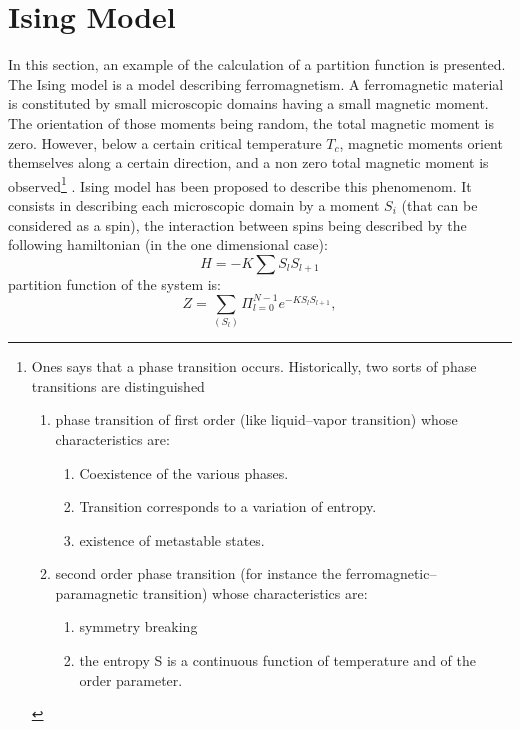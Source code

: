 \documentclass[12pt]{book}
\begin{document}
\section{Ising Model}\label{secmodising}
In this section, an example of the calculation of a partition function is
presented. The Ising model
\cite{ma:equad:Schuster88,ph:physt:Diu89}
 is a model describing ferromagnetism. 
A ferromagnetic  material is constituted by small microscopic domains having a
small magnetic moment. The orientation of those moments being random, the
total magnetic moment is zero. However, below a certain critical temperature
$T_c$, magnetic moments orient themselves along a certain direction, and a non
zero 
total magnetic moment is observed\footnote{%
Ones says that a phase transition occurs.
Historically, two sorts of phase transitions are distinguished
\cite{ph:physt:Diu89} 
\begin {enumerate}
\item phase transition of first order (like liquid--vapor transition) whose
  characteristics are:
\begin{enumerate}
\item Coexistence of the various phases.
\item Transition corresponds to a variation of entropy.
\item existence of metastable states.
\end{enumerate}
\item second order phase transition (for instance the
  ferromagnetic--paramagnetic transition) whose characteristics are:
\begin{enumerate}
\item symmetry breaking
\item the entropy S is a continuous function of temperature and of the order
  parameter.
\end{enumerate}
\end{enumerate}
}%
. Ising model has been proposed to describe this phenomenom.
It consists in describing each microscopic domain by a moment $S_i$ (that can
be considered as a spin), the interaction between spins being
described by the following hamiltonian (in the one dimensional case):
\begin{equation}
H=-K\sum S_lS_{l+1}
\end{equation}
partition function of the system is:
\begin{equation}
Z=\sum_{(S_l)}\Pi_{l=0}^{N-1}e^{-KS_lS_{l+1}},
\end{equation}
\end{document}

